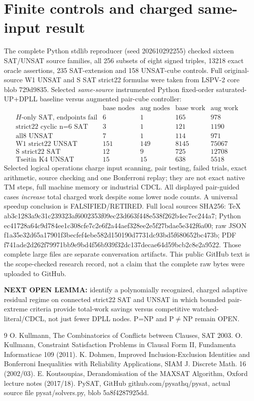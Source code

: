 \documentclass[10pt]{article}
\begin{document}
\section{Finite controls and charged same-input result}
The complete Python stdlib reproducer (seed 202610292255) checked sixteen SAT/UNSAT source families, all 256 subsets of eight signed triples, 13218 exact oracle assertions, 235 SAT-extension and 158 UNSAT-cube controls. Full original-source W1 UNSAT and S SAT strict22 formulas were taken from LSPV-2 core blob 729d9835. Selected \emph{same-source} instrumented Python fixed-order saturated-UP+DPLL baseline versus augmented pair-cube controller:
\[
\begin{array}{l|rr|rr}
&\text{base nodes}&\text{aug nodes}&\text{base work}&\text{aug work}\\\hline
H\text{-only SAT, endpoints fail}&6&1&165&978\\
\text{strict22 cyclic n=6 SAT}&3&1&121&1190\\
\text{all8 UNSAT}&7&1&114&971\\
\text{W1 strict22 UNSAT}&151&149&8145&75067\\
\text{S strict22 SAT}&12&9&725&12708\\
\text{Tseitin K4 UNSAT}&15&15&638&5518
\end{array}
\]
Selected logical operations charge input scanning, pair testing, failed trials, exact arithmetic, source checking and one Bonferroni replay; they are not exact native TM steps, full machine memory or industrial CDCL. All displayed pair-guided cases \emph{increase} total charged work despite some lower node counts. A universal speedup conclusion is FALSIFIED/RETIRED.
Full local sources SHA256: TeX ab3c1283a9c31c239323af6002353f09ec23d663f448e538f262b4ec7ec244a7; Python ec41728a64c9d784ee1c308cfe7c2e6f2a44aef328ee2e5f27bdae5e342f6a00; raw JSON f1a35e32d65a17901f3becfef4ebe582d150190d7731dc93bd5f680652bc473b; PDF f741ade2d262f79971bb9e9bd4f56b939f32dc137decae64d59bcb2c8e2a9522. Those complete large files are separate conversation artifacts. This public GitHub text is the scope-checked research record, not a claim that the complete raw bytes were uploaded to GitHub.

\noindent\textbf{NEXT OPEN LEMMA:} identify a polynomially recognized, charged adaptive residual regime on connected strict22 SAT and UNSAT in which bounded pair-extreme criteria provide total-work savings versus competitive watched-literal/CDCL, not just fewer DPLL nodes. P=NP and P$\ne$NP remain OPEN.
\begin{thebibliography}{9}
 O. Kullmann, The Combinatorics of Conflicts between Clauses, SAT 2003.
 O. Kullmann, Constraint Satisfaction Problems in Clausal Form II, Fundamenta Informaticae 109 (2011).
 K. Dohmen, Improved Inclusion-Exclusion Identities and Bonferroni Inequalities with Reliability Applications, SIAM J. Discrete Math. 16 (2002/03).
 E. Koutsoupias, Derandomisation of the MAXSAT Algorithm, Oxford lecture notes (2017/18).
 PySAT, GitHub github.com/pysathq/pysat, actual source file pysat/solvers.py, blob 5a8f4287925dd.
\end{thebibliography}
\end{document}
